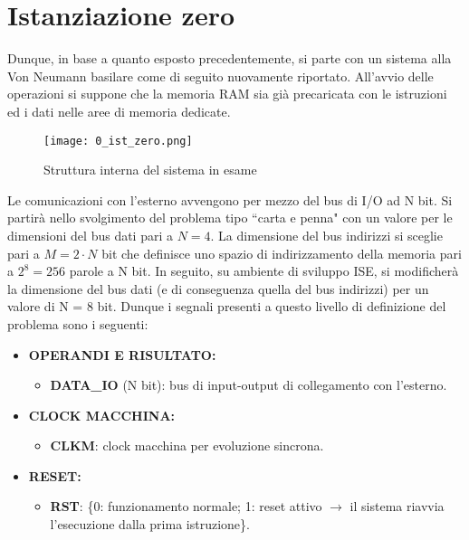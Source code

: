 \section*{Istanziazione zero}
Dunque, in base a quanto esposto precedentemente, si parte con un sistema alla Von Neumann basilare come di seguito nuovamente riportato. All'avvio delle operazioni si suppone che la memoria RAM sia già precaricata con le istruzioni ed i dati nelle aree di memoria dedicate.
\begin{figure}[H]
	\centering
	\texttt{[image: 0\_ist\_zero.png]}
	\caption{Struttura interna del sistema in esame}
	\label{fig:ist_0}
\end{figure}
\noindent
Le comunicazioni con l'esterno avvengono per mezzo del bus di I/O ad N bit. Si partirà nello svolgimento del problema tipo \textquotedblleft carta e penna" con un valore per le dimensioni del bus dati pari a $N = 4$. La dimensione del bus indirizzi si sceglie pari a $M=2\cdot N$ bit che definisce uno spazio di indirizzamento della memoria pari a $2^{8} = 256$ parole a N bit. In seguito, su ambiente di sviluppo ISE, si modificherà la dimensione del bus dati (e di conseguenza quella del bus indirizzi) per un valore di N = 8 bit. Dunque i segnali presenti a questo livello di definizione del problema sono i seguenti:
\begin{itemize}
	\item \textbf{OPERANDI E RISULTATO:}
	\begin{itemize}
		\item \textbf{DATA\_IO} (N bit): bus di input-output di collegamento con l'esterno.
	\end{itemize}

	\item \textbf{CLOCK MACCHINA:}
	\begin{itemize}
		\item \textbf{CLKM}: clock macchina per evoluzione sincrona.
	\end{itemize}

	\item \textbf{RESET:}
	\begin{itemize}
		\item \textbf{RST}: \{0: funzionamento normale; 1: reset attivo $\rightarrow$ il sistema riavvia l'esecuzione dalla prima istruzione\}.
	\end{itemize}
\end{itemize}
